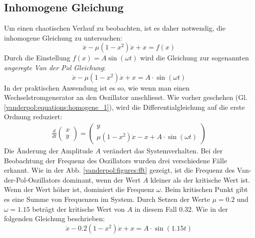 \subsection{Inhomogene Gleichung}
\label{vanderpol:subsection:inhomogene}
Um einen chaotischen Verlauf zu beobachten, ist es daher notwendig, die inhomogene Gleichung zu untersuchen:
\begin{equation*}
	\ddot{x}-\mu\left(1-x^{2}\right) \dot{x}+x = f(x)
\label{vanderpol:equations:inhomogene_gen}
\end{equation*}
Durch die Einstellung $f(x) = A \sin(\omega t)$ wird die Gleichung zur sogenannten {\em angeregte Van der Pol Gleichung}:
\begin{equation}
	\ddot{x}-\mu\left(1-x^{2}\right) \dot{x}+x = A \cdot \sin(\omega t)
\label{vanderpol:equations:inhomogene_sin}
\end{equation}
In der praktischen Anwendung ist es so, wie wenn man einen Wechselstromgenerator an den Oszillator anschliesst. Wie vorher geschehen (Gl. \ref{vanderpol:equations:homogene_1}), wird die Differentialgleichung auf die erste Ordnung reduziert:
\begin{align}
\frac{d}{dt}\begin{pmatrix}x \\ y\end{pmatrix} = \begin{pmatrix}y \\ \mu \left(1-x^{2}\right)\dot{x}-x+A \cdot \sin(\omega t)\end{pmatrix}
\label{vanderpol:equations:inhomogene_2}
\end{align}
Die Änderung der Amplitude $A$ verändert das Systemverhalten. Bei der Beobachtung der Frequenz des Oszillators wurden drei verschiedene Fälle erkannt. Wie in der Abb. \ref{vanderpol:figures:fft} gezeigt, ist die Frequenz des Van-der-Pol-Oszillators dominant, wenn der Wert $A$ kleiner als der kritische Wert ist. Wenn der Wert höher ist, dominiert die Frequenz $\omega$. Beim kritischen Punkt gibt es eine Summe von Frequenzen im System. Durch Setzen der Werte $\mu=0.2$ und $\omega=1.15$ beträgt der kritische Wert von $A$ in diesem Fall $0.32$. Wie in der folgenden Gleichung beschrieben:
\begin{equation}
	\ddot{x}-0.2\left(1-x^{2}\right) \dot{x}+x = A \cdot \sin(1.15 t)
	\label{vanderpol:equations:inhomogene_3}
\end{equation}


